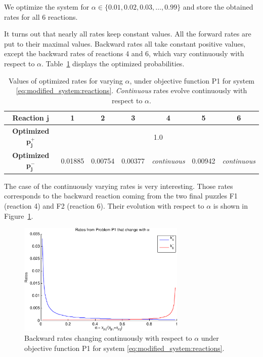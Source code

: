 	We optimize the system for $\alpha \in \{0.01, 0.02, 0.03, \ldots, 0.99\}$ and store the obtained rates for all 6 reactions.
	
	It turns out that nearly all rates keep constant values. All the forward rates are put to their maximal values. Backward rates all take constant positive values, except the backward rates of reactions 4 and 6, which vary continuously with respect to $\alpha$. Table~\ref{tab:optimized_rates_p1} displays the optimized probabilities.
	
	\begin{table}[h!]
		\begin{center}
		\begin{tabular}{|c|c|c|c|c|c|c|}
			\hline
			\textbf{Reaction} $\mathbf{j}$ & \textbf{1} & \textbf{2} & \textbf{3} & \textbf{4} & \textbf{5} & \textbf{6} \\
			\hline
			\textbf{Optimized} $\mathbf{p^+_j}$ & \multicolumn{6}{c|}{1.0} \\
			\hline
			\textbf{Optimized} $\mathbf{p^-_j}$ & 0.01885 & 0.00754 & 0.00377 & \textit{continuous} & 0.00942 & \textit{continuous} \\
			\hline
		\end{tabular}
		\end{center}
		\caption{Values of optimized rates for varying $\alpha$, under objective function P1 for system \eqref{eq:modified_system:reactions}. \textit{Continuous} rates evolve continuously with respect to $\alpha$.}
		\label{tab:optimized_rates_p1}
	\end{table}
	
	The case of the continuously varying rates is very interesting. Those rates corresponds to the backward reaction coming from the two final puzzles F1 (reaction 4) and F2 (reaction 6). Their evolution with respect to $\alpha$ is shown in Figure~\ref{fig:img_optimized_rates_alpha_p1}.
	 
	\begin{figure}[h!]
		\centering
			\includegraphics[width=8cm]{img/optimized_rates_alpha_p1.pdf}
		\caption{Backward rates changing continuously with respect to $\alpha$ under objective function P1 for system \eqref{eq:modified_system:reactions}.}
		\label{fig:img_optimized_rates_alpha_p1}
	\end{figure}
		
